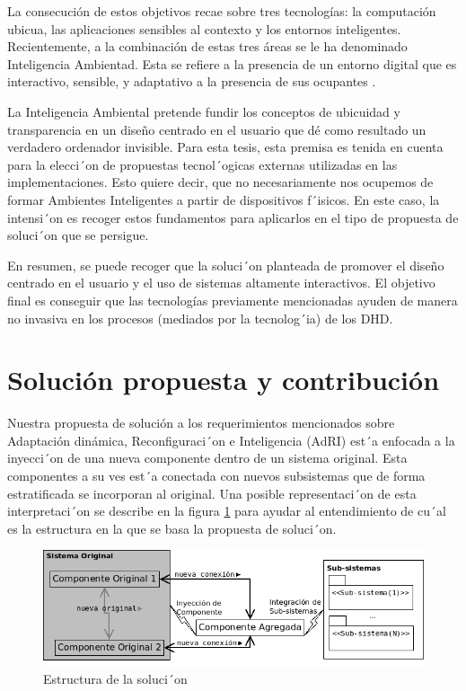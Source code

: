 La consecución de estos objetivos recae sobre tres tecnologías: la computación
ubicua, las aplicaciones sensibles al contexto y los entornos inteligentes.
Recientemente, a la combinación de estas tres áreas se le ha denominado
Inteligencia  Ambientad. Esta se refiere a la presencia de un entorno digital
que es interactivo, sensible, y adaptativo a la presencia de sus ocupantes
\cite{cap1.16}.

La Inteligencia Ambiental pretende fundir los conceptos de ubicuidad y
transparencia en un diseño centrado en el usuario que dé como resultado un
verdadero ordenador invisible. Para esta tesis, esta premisa es tenida en
cuenta para la elecci´on de propuestas tecnol´ogicas externas utilizadas en las
implementaciones. Esto quiere decir, que no necesariamente nos ocupemos de
formar Ambientes Inteligentes a partir de dispositivos f´isicos. En este caso,
la intensi´on es recoger estos fundamentos para aplicarlos en el tipo de
propuesta de soluci´on que se persigue. 

En resumen, se puede recoger que la soluci´on planteada de promover  el diseño
centrado en el usuario y el uso de sistemas altamente interactivos. El objetivo
final es conseguir que las tecnologías previamente mencionadas ayuden de manera
no invasiva en los procesos (mediados por la tecnolog´ia) de los DHD.

\section{Solución propuesta y contribución}

Nuestra propuesta de solución a los requerimientos mencionados sobre
Adaptación dinámica, Reconfiguraci´on e Inteligencia (AdRI) est´a enfocada a la
inyecci´on de una nueva componente dentro de un sistema original. Esta
componentes a su ves est´a conectada con nuevos subsistemas que de forma
estratificada se incorporan al original. Una posible representaci´on de esta
interpretaci´on se describe en la figura \ref{fig:solucion} para ayudar al
entendimiento de cu´al es la estructura en la que se basa la propuesta de
soluci´on.



\begin{figure}[h]
\begin{center}
 \includegraphics[width=4 in,totalheight=3 in] {Ch0/solucion}
\caption{Estructura de la soluci´on} \label{fig:solucion}
\end{center}
\end{figure}

